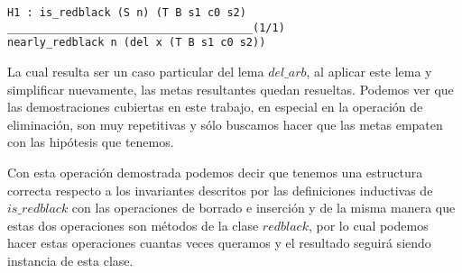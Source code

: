 \begin{verbatim}
H1 : is_redblack (S n) (T B s1 c0 s2)
______________________________________(1/1)
nearly_redblack n (del x (T B s1 c0 s2))
\end{verbatim}

La cual resulta ser un caso particular del lema \hyperref[lema_6]{$del\_arb$}, al aplicar este lema 
y simplificar nuevamente, las metas resultantes quedan resueltas. Podemos ver que las demostraciones 
cubiertas en este trabajo, en especial en la operaci\'on de eliminación, son muy repetitivas y s\'olo 
buscamos hacer que las metas empaten con las hip\'otesis que tenemos.

Con esta operaci\'on demostrada podemos decir que tenemos una estructura correcta respecto
a los invariantes descritos por las definiciones inductivas de 
\hyperref[inductive_isRedB]{$is\_redblack$} con las operaciones de borrado e inserción y de la misma 
manera que estas dos operaciones son métodos de la clase \hyperref[class_rb]{$redblack$}, por lo 
cual podemos hacer estas operaciones cuantas veces queramos y el resultado seguirá siendo instancia 
de esta clase.
